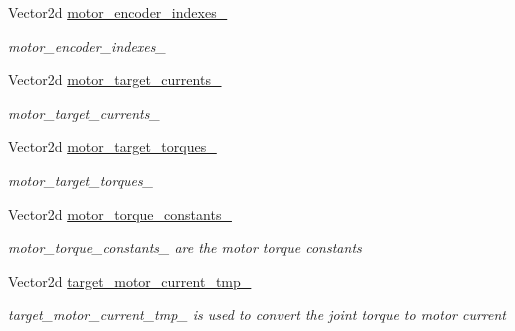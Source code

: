 \begin{DoxyCompactItemize}
\mbox{\label{classblmc__robots_1_1SingleLeg_a8ac67df4a61c02ca927bbcab5c4bab0b}} 
Vector2d \hyperlink{classblmc__robots_1_1SingleLeg_a8ac67df4a61c02ca927bbcab5c4bab0b}{motor\+\_\+encoder\+\_\+indexes\+\_\+}
\begin{DoxyCompactList}\small\item\em motor\+\_\+encoder\+\_\+indexes\+\_\+ \end{DoxyCompactList}\item 
\mbox{\label{classblmc__robots_1_1SingleLeg_a1727423baf1d924c5c38b5da82760daa}} 
Vector2d \hyperlink{classblmc__robots_1_1SingleLeg_a1727423baf1d924c5c38b5da82760daa}{motor\+\_\+target\+\_\+currents\+\_\+}
\begin{DoxyCompactList}\small\item\em motor\+\_\+target\+\_\+currents\+\_\+ \end{DoxyCompactList}\item 
\mbox{\label{classblmc__robots_1_1SingleLeg_a877ea486d60de86dda6f2f584483cd63}} 
Vector2d \hyperlink{classblmc__robots_1_1SingleLeg_a877ea486d60de86dda6f2f584483cd63}{motor\+\_\+target\+\_\+torques\+\_\+}
\begin{DoxyCompactList}\small\item\em motor\+\_\+target\+\_\+torques\+\_\+ \end{DoxyCompactList}\item 
\mbox{\label{classblmc__robots_1_1SingleLeg_acc9db4fea29151b45841b63a75d6cb18}} 
Vector2d \hyperlink{classblmc__robots_1_1SingleLeg_acc9db4fea29151b45841b63a75d6cb18}{motor\+\_\+torque\+\_\+constants\+\_\+}
\begin{DoxyCompactList}\small\item\em motor\+\_\+torque\+\_\+constants\+\_\+ are the motor torque constants \end{DoxyCompactList}\item 
\mbox{\label{classblmc__robots_1_1SingleLeg_a5408963ab970855f3ab0c5fc0fb51803}} 
Vector2d \hyperlink{classblmc__robots_1_1SingleLeg_a5408963ab970855f3ab0c5fc0fb51803}{target\+\_\+motor\+\_\+current\+\_\+tmp\+\_\+}
\begin{DoxyCompactList}\small\item\em target\+\_\+motor\+\_\+current\+\_\+tmp\+\_\+ is used to convert the joint torque to motor current \end{DoxyCompactList}\item 

\end{DoxyCompactItemize}
